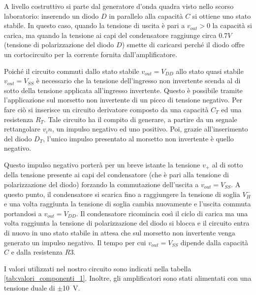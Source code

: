 A livello costruttivo si parte dal generatore d'onda quadra visto nello scorso laboratorio: inserendo un diodo $D$ in parallelo alla capacità $C$ si ottiene uno stato stabile. In questo caso, quando la tensione di uscita è pari a $v_{out}>0$ la capacità si carica, ma quando la tensione ai capi del condensatore raggiunge circa $0.7V$ (tensione di polarizzazione del diodo $D$) smette di caricarsi perché il diodo offre un cortocircuito per la corrente fornita dall'amplificatore. 

\noindent
Poiché il circuito commuti dallo stato stabile $v_{out}=V_{DD}$ allo stato quasi stabile $v_{out}=V_{SS}$ è necessario che la tensione dell'ingresso non invertente scenda al di sotto della tensione applicata all'ingresso invertente. Questo è possibile tramite l'applicazione sul morsetto non invertente di un picco di tensione negativo. Per fare ciò si inserisce un circuito derivatore composto da una capacità $C_T$ ed una resistenza $R_T$. Tale circuito ha il compito di generare, a partire da un segnale rettangolare $v_in$, un impulso negativo ed uno positivo. Poi, grazie all'inserimento del diodo $D_T$, l'unico impulso presentato al morsetto non invertente è quello negativo. 

\noindent
Questo impulso negativo porterà per un breve istante la tensione $v_+$ al di sotto della tensione presente ai capi del condensatore (che è pari alla tensione di polarizzazione del diodo) forzando la commutazione dell'uscita a $v_{out}=V_{SS}$. A questo punto, il condensatore si scarica fino a raggiungere la tensione di soglia $V_H^-$ e una volta raggiunta la tensione di soglia cambia nuovamente e l'uscita commuta portandosi a $v_{out}=V_{DD}$. Il condensatore ricomincia così il ciclo di carica ma una volta raggiunta la tensione di polarizzazione del diodo si blocca e il circuito entra di nuovo in uno stato stabile in attesa che sul morsetto non invertente venga generato un impulso negativo. Il tempo per cui $v_{out}=V_{SS}$ dipende dalla capacità $C$ e dalla resistenza $R3$.

I valori utilizzati nel nostro circuito sono indicati nella tabella \ref{tab:valori_componenti_1}. Inoltre, gli amplificatori sono stati alimentati con una tensione duale di $\pm$\SI{10}{\volt}.

